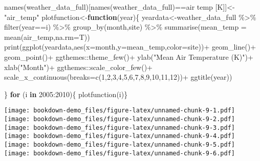 \documentclass[
]{book}
\newenvironment{Shaded}{\begin{snugshade}}{\end{snugshade}}
\newcommand{\AttributeTok}[1]{\textcolor[rgb]{0.77,0.63,0.00}{#1}}
\newcommand{\ControlFlowTok}[1]{\textcolor[rgb]{0.13,0.29,0.53}{\textbf{#1}}}
\newcommand{\DecValTok}[1]{\textcolor[rgb]{0.00,0.00,0.81}{#1}}
\newcommand{\FunctionTok}[1]{\textcolor[rgb]{0.00,0.00,0.00}{#1}}
\newcommand{\NormalTok}[1]{#1}
\newcommand{\OtherTok}[1]{\textcolor[rgb]{0.56,0.35,0.01}{#1}}
\newcommand{\SpecialCharTok}[1]{\textcolor[rgb]{0.00,0.00,0.00}{#1}}
\newcommand{\StringTok}[1]{\textcolor[rgb]{0.31,0.60,0.02}{#1}}
\begin{document}
\begin{Shaded}
\begin{Highlighting}[]
\FunctionTok{names}\NormalTok{(weather\_data\_full)[}\FunctionTok{names}\NormalTok{(weather\_data\_full)}\SpecialCharTok{==}\StringTok{\textquotesingle{}air temp [K]\textquotesingle{}}\NormalTok{]}\OtherTok{\textless{}{-}}\StringTok{"air\_temp"}
\NormalTok{plotfunction}\OtherTok{\textless{}{-}}\ControlFlowTok{function}\NormalTok{(year)\{}
\NormalTok{  yeardata}\OtherTok{\textless{}{-}}\NormalTok{weather\_data\_full }\SpecialCharTok{\%\textgreater{}\%} \FunctionTok{filter}\NormalTok{(year}\SpecialCharTok{==}\NormalTok{i) }\SpecialCharTok{\%\textgreater{}\%}
    \FunctionTok{group\_by}\NormalTok{(month,site) }\SpecialCharTok{\%\textgreater{}\%}
    \FunctionTok{summarise}\NormalTok{(}\AttributeTok{mean\_temp =} \FunctionTok{mean}\NormalTok{(air\_temp,}\AttributeTok{na.rm=}\NormalTok{T))}
  \FunctionTok{print}\NormalTok{(}\FunctionTok{ggplot}\NormalTok{(yeardata,}\FunctionTok{aes}\NormalTok{(}\AttributeTok{x=}\NormalTok{month,}\AttributeTok{y=}\NormalTok{mean\_temp,}\AttributeTok{color=}\NormalTok{site))}\SpecialCharTok{+}
          \FunctionTok{geom\_line}\NormalTok{()}\SpecialCharTok{+}
          \FunctionTok{geom\_point}\NormalTok{()}\SpecialCharTok{+}
\NormalTok{          ggthemes}\SpecialCharTok{::}\FunctionTok{theme\_few}\NormalTok{()}\SpecialCharTok{+} 
          \FunctionTok{ylab}\NormalTok{(}\StringTok{"Mean Air Temperature (K)"}\NormalTok{)}\SpecialCharTok{+}
          \FunctionTok{xlab}\NormalTok{(}\StringTok{"Month"}\NormalTok{)}\SpecialCharTok{+}
\NormalTok{          ggthemes}\SpecialCharTok{::}\FunctionTok{scale\_color\_few}\NormalTok{()}\SpecialCharTok{+}
          \FunctionTok{scale\_x\_continuous}\NormalTok{(}\AttributeTok{breaks=}\FunctionTok{c}\NormalTok{(}\DecValTok{1}\NormalTok{,}\DecValTok{2}\NormalTok{,}\DecValTok{3}\NormalTok{,}\DecValTok{4}\NormalTok{,}\DecValTok{5}\NormalTok{,}\DecValTok{6}\NormalTok{,}\DecValTok{7}\NormalTok{,}\DecValTok{8}\NormalTok{,}\DecValTok{9}\NormalTok{,}\DecValTok{10}\NormalTok{,}\DecValTok{11}\NormalTok{,}\DecValTok{12}\NormalTok{))}\SpecialCharTok{+}
          \FunctionTok{ggtitle}\NormalTok{(year))}
        
\NormalTok{\}}
\ControlFlowTok{for}\NormalTok{ (i }\ControlFlowTok{in} \DecValTok{2005}\SpecialCharTok{:}\DecValTok{2010}\NormalTok{)\{}
  \FunctionTok{plotfunction}\NormalTok{(i)\}}
\end{Highlighting}
\end{Shaded}

\texttt{[image: bookdown-demo\_files/figure-latex/unnamed-chunk-9-1.pdf]} \texttt{[image: bookdown-demo\_files/figure-latex/unnamed-chunk-9-2.pdf]} \texttt{[image: bookdown-demo\_files/figure-latex/unnamed-chunk-9-3.pdf]} \texttt{[image: bookdown-demo\_files/figure-latex/unnamed-chunk-9-4.pdf]} \texttt{[image: bookdown-demo\_files/figure-latex/unnamed-chunk-9-5.pdf]} \texttt{[image: bookdown-demo\_files/figure-latex/unnamed-chunk-9-6.pdf]}
\end{document}
